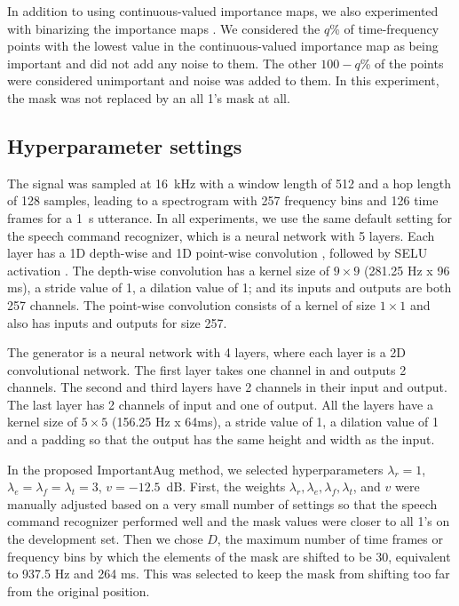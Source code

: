 \documentclass{article}
\begin{document}
In addition to using continuous-valued importance maps, we also experimented with binarizing the importance maps . We considered the $q$\% of time-frequency points with the lowest value in the continuous-valued importance map as being important and did not add any noise to them. The other $100-q$\% of the points were considered unimportant and noise was added to them. In this experiment, the mask was not replaced by an all 1's mask at all.


\subsection{Hyperparameter settings}

The signal was sampled at 16~kHz with a window length of 512 and a hop length of 128 samples, leading to a spectrogram with 257 frequency bins and 126 time frames for a 1~s utterance. In all experiments, we use the same default setting for the speech command recognizer, which is a neural network with 5 layers. Each layer has a 1D depth-wise and 1D point-wise convolution \cite{chollet2017xception, Somshubra20}, followed by SELU activation \cite{klambauer2017self}. The depth-wise convolution has a kernel size of $9\times 9$ (281.25 Hz x 96 ms), a stride value of 1, a dilation value of 1; and its inputs and outputs are both 257 channels. The point-wise convolution consists of a kernel of size $1 \times 1$ and also has inputs and outputs for size 257. 

The generator is a neural network with 4 layers, where each layer is a 2D convolutional network. The first layer takes one channel in and outputs 2 channels. The second and third layers have 2 channels in their input and output. The last layer has 2 channels of input and one of output. All the layers have a kernel size of $5 \times 5$ (156.25 Hz x 64ms), a stride value of 1, a dilation value of 1 and a padding so that the output has the same height and width as the input. 

In the proposed ImportantAug method, we selected hyperparameters $\lambda_r = 1$, $\lambda_e=\lambda_f=\lambda_t=3$, $v=-12.5$~dB. First, the weights $\lambda_r, \lambda_e, \lambda_f, \lambda_t$, and $v$ were manually adjusted based on a very small number of settings so that the speech command recognizer performed well and the mask values were closer to all 1's on the development set. Then we chose $D$, the maximum number of time frames or frequency bins by which the elements of the mask are shifted to be 30, equivalent to 937.5 Hz and 264 ms. This was selected to keep the mask from shifting too far from the original position.
\end{document}
